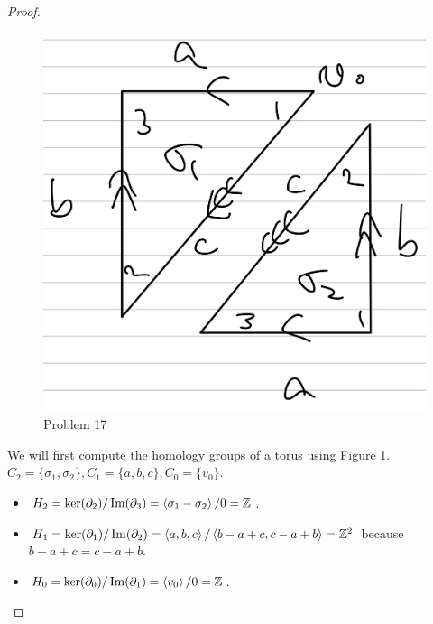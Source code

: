 \documentclass[12pt, psamsfonts]{amsart}
\theoremstyle{definition}
\theoremstyle{remark}
\numberwithin{equation}{section}
\begin{document}
\begin{proof}
\begin{itemize}
      \begin{figure}
        \includegraphics[width=.5\linewidth]{torus_homology.jpeg}
        \caption{Problem 17}
        \label{fig:torus_homology}
      \end{figure}
      We will first compute the homology groups of a torus using Figure \ref{fig:torus_homology}.
      $C_2 = \{ \sigma_1, \sigma_2 \}, C_1 = \{ a, b, c \}, C_0 = \{ v_0 \}$.
      \begin{itemize}
        \item
          $H_2 = \ker(\partial_2) / \Im(\partial_3) = \ev{ \sigma_1 - \sigma_2 } / 0 = \mathbb{Z}$.
        \item
          $H_1 = \ker(\partial_1) / \Im(\partial_2) = \ev{ a, b, c } / \ev{ b - a + c, c - a + b } = \mathbb{Z}^2$ because $b - a + c = c - a + b$.
        \item
          $H_0 = \ker(\partial_0) / \Im(\partial_1) = \ev{ v_0 } / 0 = \mathbb{Z}$.
     \end{itemize}


\end{itemize}
\end{proof}
\end{document}
